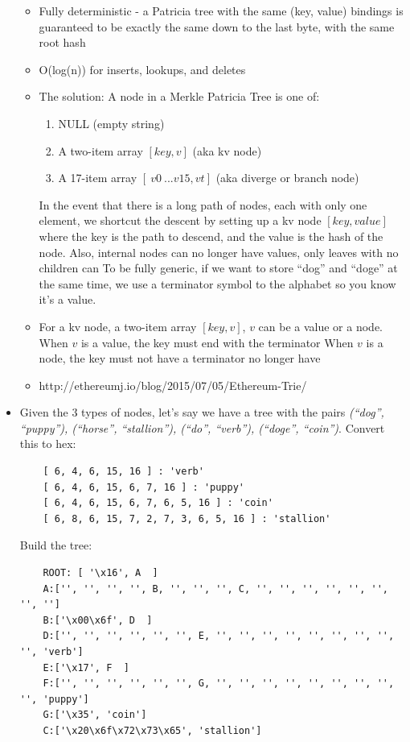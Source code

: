 \documentclass{article}
\begin{document}
\begin{itemize}
\begin{itemize}
      \item Fully deterministic - a Patricia tree with the same (key, value) bindings is guaranteed to be exactly the same down to the last byte, with the same
        root hash
      \item O(log(n)) for inserts, lookups, and deletes
      \item The solution: A node in a Merkle Patricia Tree is one of:
        \begin{enumerate}
          \item NULL (empty string)
          \item A two-item array $[key, v]$ (aka kv node)
          \item A 17-item array $[\ v0\ ... v15, vt]$ (aka diverge or branch node)
        \end{enumerate}
        \subitem In the event that there is a long path of nodes, each with only one element, we shortcut the descent by setting
        up a kv node $[key, value]$ where the key is the path to descend, and the value is the hash of the node. 
        \subitem Also, internal nodes can no longer have values, only leaves with no children can
        \subitem To be fully generic, if we want to store ``dog'' and ``doge'' at the same time, we use a terminator symbol to the alphabet
        so you know it's a value.
      \item For a kv node, a two-item array $[key, v]$, $v$ can be a value or a node.
        \subitem When $v$ is a value, the key must end with the terminator
        \subitem When $v$ is a node, the key must not have a terminator
        no longer have
      \item http://ethereumj.io/blog/2015/07/05/Ethereum-Trie/
    \end{itemize}
  \item Given the 3 types of nodes, let's say we have a tree with the pairs \emph{(``dog'', ``puppy''), (``horse'', ``stallion''), (``do'', ``verb''), (``doge'', ``coin'')}.
    \subitem Convert this to hex:
    \begin{lstlisting}
    [ 6, 4, 6, 15, 16 ] : 'verb'
    [ 6, 4, 6, 15, 6, 7, 16 ] : 'puppy'
    [ 6, 4, 6, 15, 6, 7, 6, 5, 16 ] : 'coin'
    [ 6, 8, 6, 15, 7, 2, 7, 3, 6, 5, 16 ] : 'stallion'
    \end{lstlisting}
    \subitem Build the tree:
    \begin{lstlisting}
    ROOT: [ '\x16', A  ]
    A:['', '', '', '', B, '', '', '', C, '', '', '', '', '', '', '', '']
    B:['\x00\x6f', D  ]
    D:['', '', '', '', '', '', E, '', '', '', '', '', '', '', '', '', 'verb']
    E:['\x17', F  ]
    F:['', '', '', '', '', '', G, '', '', '', '', '', '', '', '', '', 'puppy']
    G:['\x35', 'coin']
    C:['\x20\x6f\x72\x73\x65', 'stallion']
    \end{lstlisting}
\end{itemize}
\end{document}
